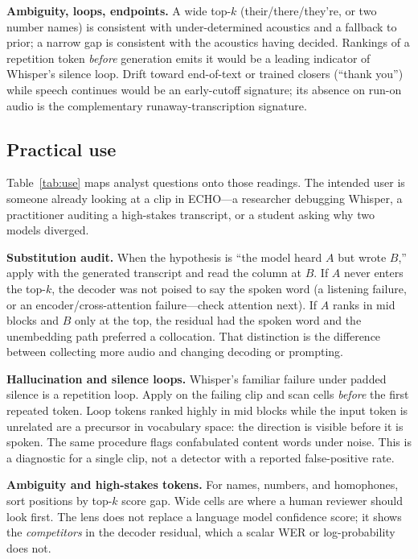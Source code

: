 \documentclass[conference]{IEEEtran}
\begin{document}
\textbf{Ambiguity, loops, endpoints.}
A wide top-\(k\) (their/there/they're, or two number names) is consistent with under-determined acoustics and a fallback to prior; a narrow gap is consistent with the acoustics having decided. Rankings of a repetition token \emph{before} generation emits it would be a leading indicator of Whisper's silence loop. Drift toward end-of-text or trained closers (``thank you'') while speech continues would be an early-cutoff signature; its absence on run-on audio is the complementary runaway-transcription signature.

\subsection{Practical use}

Table~\ref{tab:use} maps analyst questions onto those readings. The intended user is someone already looking at a clip in ECHO---a researcher debugging Whisper, a practitioner auditing a high-stakes transcript, or a student asking why two models diverged.

\textbf{Substitution audit.}
When the hypothesis is ``the model heard \(A\) but wrote \(B\),'' apply with the generated transcript and read the column at \(B\). If \(A\) never enters the top-\(k\), the decoder was not poised to say the spoken word (a listening failure, or an encoder/cross-attention failure---check attention next). If \(A\) ranks in mid blocks and \(B\) only at the top, the residual had the spoken word and the unembedding path preferred a collocation. That distinction is the difference between collecting more audio and changing decoding or prompting.

\textbf{Hallucination and silence loops.}
Whisper's familiar failure under padded silence is a repetition loop. Apply on the failing clip and scan cells \emph{before} the first repeated token. Loop tokens ranked highly in mid blocks while the input token is unrelated are a precursor in vocabulary space: the direction is visible before it is spoken. The same procedure flags confabulated content words under noise. This is a diagnostic for a single clip, not a detector with a reported false-positive rate.

\textbf{Ambiguity and high-stakes tokens.}
For names, numbers, and homophones, sort positions by top-\(k\) score gap. Wide cells are where a human reviewer should look first. The lens does not replace a language model confidence score; it shows the \emph{competitors} in the decoder residual, which a scalar WER or log-probability does not.
\end{document}
